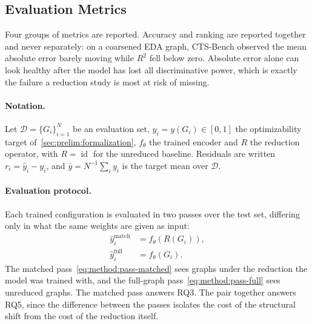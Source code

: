 \subsection{Evaluation Metrics}
\label{sec:method:experiment:metrics}
Four groups of metrics are reported. Accuracy and ranking are reported together and never
separately: on a coarsened EDA graph, CTS-Bench \citep{cts_bench2026} observed the mean
absolute error barely moving while $R^2$ fell below zero. Absolute error alone can look
healthy after the model has lost all discriminative power, which is exactly the failure a
reduction study is most at risk of missing.

\paragraph{Notation.}
Let $\mathcal{D} = \{G_i\}_{i=1}^{N}$ be an evaluation set, $y_i = y(G_i) \in [0, 1]$ the
optimizability target of~\ref{sec:prelim:formalization}, $f_\theta$ the trained encoder and
$R$ the reduction operator, with $R = \operatorname{id}$ for the unreduced baseline.
Residuals are written $r_i = \hat{y}_i - y_i$, and $\bar{y} = N^{-1} \sum_{i} y_i$ is the
target mean over $\mathcal{D}$.

\paragraph{Evaluation protocol.}
Each trained configuration is evaluated in two passes over the test set, differing only in
what the same weights are given as input:
\begin{align}
    \hat{y}_i^{\text{match}} &= f_\theta\!\left( R(G_i) \right),
    \label{eq:method:pass-matched} \\
    \hat{y}_i^{\text{full}} &= f_\theta\!\left( G_i \right).
    \label{eq:method:pass-full}
\end{align}
The matched pass~\eqref{eq:method:pass-matched} sees graphs under the reduction the model
was trained with, and the full-graph pass~\eqref{eq:method:pass-full} sees unreduced graphs.
The matched pass answers RQ3. The pair together answers RQ5, since the difference between
the passes isolates the cost of the structural shift from the cost of the reduction itself.

